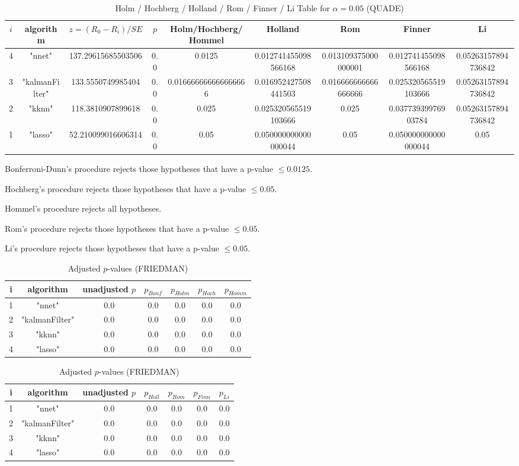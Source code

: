 \documentclass[a4paper,10pt]{article}
\begin{document}
\begin{landscape}
\begin{table}[!htp]
\centering\scriptsize
\caption{Holm / Hochberg / Holland / Rom / Finner / Li Table for $\alpha=0.05$ (QUADE)}
\begin{tabular}{ccccccccc}
$i$&algorithm&$z=(R_0 - R_i)/SE$&$p$&Holm/Hochberg/Hommel&Holland&Rom&Finner&Li\\
\hline
4&"nnet"&137.29615685503506&0.0&0.0125&0.012741455098566168&0.013109375000000001&0.012741455098566168&0.05263157894736842\\
3&"kalmanFilter"&133.5550749985404&0.0&0.016666666666666666&0.016952427508441503&0.016666666666666666&0.025320565519103666&0.05263157894736842\\
2&"kknn"&118.3810907899618&0.0&0.025&0.025320565519103666&0.025&0.03773939976903784&0.05263157894736842\\
1&"lasso"&52.210099016606314&0.0&0.05&0.050000000000000044&0.05&0.050000000000000044&0.05\\
\hline
\end{tabular}
\end{table}
Bonferroni-Dunn's procedure rejects those hypotheses that have a p-value $\le0.0125$.


Hochberg's procedure rejects those hypotheses that have a p-value $\le0.05$.


Hommel's procedure rejects all hypotheses.


Rom's procedure rejects those hypotheses that have a p-value $\le0.05$.


Li's procedure rejects those hypotheses that have a p-value $\le0.05$.



\newpage

\begin{table}[!htp]
\centering\scriptsize
\caption{Adjusted $p$-values (FRIEDMAN)}
\begin{tabular}{ccccccc}
i&algorithm&unadjusted $p$&$p_{Bonf}$&$p_{Holm}$&$p_{Hoch}$&$p_{Homm}$\\
\hline
1&"nnet"&0.0&0.0&0.0&0.0&0.0\\
2&"kalmanFilter"&0.0&0.0&0.0&0.0&0.0\\
3&"kknn"&0.0&0.0&0.0&0.0&0.0\\
4&"lasso"&0.0&0.0&0.0&0.0&0.0\\
\hline
\end{tabular}
\end{table}

\begin{table}[!htp]
\centering\scriptsize
\caption{Adjusted $p$-values (FRIEDMAN)}
\begin{tabular}{ccccccc}
i&algorithm&unadjusted $p$&$p_{Holl}$&$p_{Rom}$&$p_{Finn}$&$p_{Li}$\\
\hline
1&"nnet"&0.0&0.0&0.0&0.0&0.0\\
2&"kalmanFilter"&0.0&0.0&0.0&0.0&0.0\\
3&"kknn"&0.0&0.0&0.0&0.0&0.0\\
4&"lasso"&0.0&0.0&0.0&0.0&0.0\\
\hline
\end{tabular}
\end{table}



\end{landscape}
\end{document}
